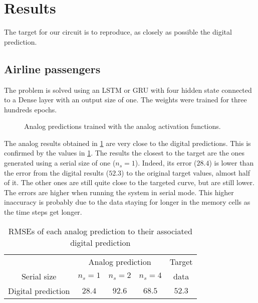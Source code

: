 \section{Results}

The target for our circuit is to reproduce, as closely as possible the digital prediction.

\subsection{Airline passengers}

The problem is solved using an LSTM or GRU with four hidden state connected to a Dense layer with an output size of one. The weights were trained for three hundreds epochs.

\begin{figure}[h]
  \centering
  
  \caption{Analog predictions trained with the analog activation functions.}
  \label{graph:airlineAnalog}
\end{figure}

The analog results obtained in \cref{graph:airlineAnalog} are very close to the digital predictions. This is confirmed by the values in \cref{tab:airlineAnalog}. The results the closest to the target are the ones generated using a serial size of one ($n_s=1$). Indeed, its error ($28.4$) is lower than the error from the digital results ($52.3$) to the original target values, almost half of it. The other ones are still quite close to the targeted curve, but are still lower. The errors are higher when running the system in serial mode. This higher inaccuracy is probably due to the data staying for longer in the memory cells as the time steps get longer.

\begin{table}[h]
  \caption{\acp{RMSE} of each analog prediction to their associated digital prediction}
  \label{tab:airlineAnalog}
  \centering
  \begin{tabular}{|c|c|c|c|c|}
    \cline{2-5}
    \multicolumn{1}{c}{}& \multicolumn{3}{|c|}{Analog prediction} &Target\\
    \cline{1-4}
    Serial size & $n_s=1$ & $n_s=2$ & $n_s=4$ & data\\
    \hline
    Digital prediction & $28.4$ & $92.6$ & $68.5$ & $52.3$\\
    \hline
  \end{tabular}
\end{table}

